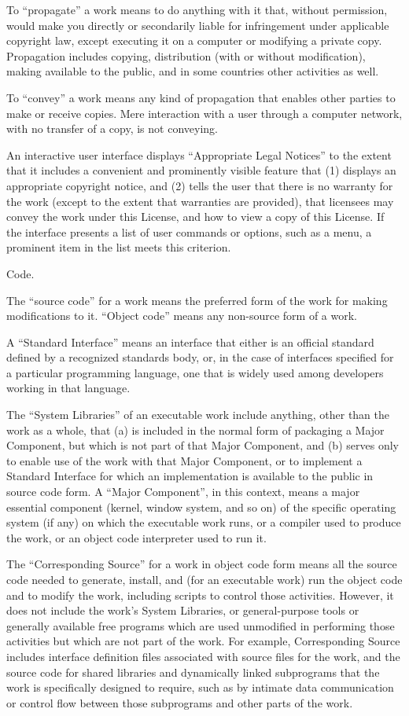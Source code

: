 To ``propagate'' a work means to do anything with it that, without
permission, would make you directly or secondarily liable for
infringement under applicable copyright law, except executing it on a
computer or modifying a private copy.  Propagation includes copying,
distribution (with or without modification), making available to the
public, and in some countries other activities as well.

To ``convey'' a work means any kind of propagation that enables other
parties to make or receive copies.  Mere interaction with a user
through a computer network, with no transfer of a copy, is not
conveying.

An interactive user interface displays ``Appropriate Legal Notices'' to
the extent that it includes a convenient and prominently visible
feature that (1) displays an appropriate copyright notice, and (2)
tells the user that there is no warranty for the work (except to the
extent that warranties are provided), that licensees may convey the
work under this License, and how to view a copy of this License.  If
the interface presents a list of user commands or options, such as a
menu, a prominent item in the list meets this criterion.

\itemSource Code.

The ``source code'' for a work means the preferred form of the work for
making modifications to it.  ``Object code'' means any non-source form
of a work.

A ``Standard Interface'' means an interface that either is an official
standard defined by a recognized standards body, or, in the case of
interfaces specified for a particular programming language, one that
is widely used among developers working in that language.

The ``System Libraries'' of an executable work include anything, other
than the work as a whole, that (a) is included in the normal form of
packaging a Major Component, but which is not part of that Major
Component, and (b) serves only to enable use of the work with that
Major Component, or to implement a Standard Interface for which an
implementation is available to the public in source code form.  A
``Major Component'', in this context, means a major essential component
(kernel, window system, and so on) of the specific operating system
(if any) on which the executable work runs, or a compiler used to
produce the work, or an object code interpreter used to run it.

The ``Corresponding Source'' for a work in object code form means all
the source code needed to generate, install, and (for an executable
work) run the object code and to modify the work, including scripts to
control those activities.  However, it does not include the work's
System Libraries, or general-purpose tools or generally available free
programs which are used unmodified in performing those activities but
which are not part of the work.  For example, Corresponding Source
includes interface definition files associated with source files for
the work, and the source code for shared libraries and dynamically
linked subprograms that the work is specifically designed to require,
such as by intimate data communication or control flow between those
subprograms and other parts of the work.

